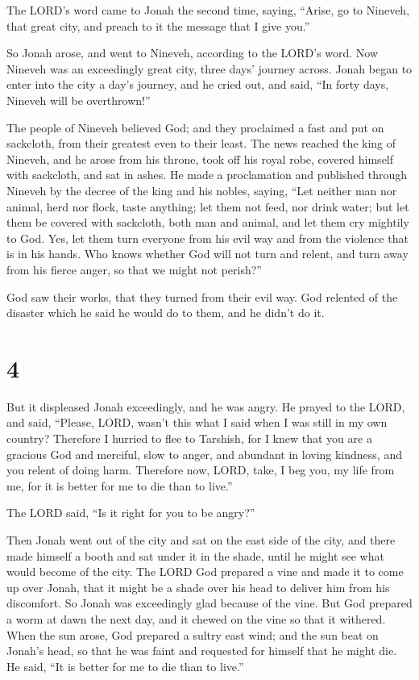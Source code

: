  The LORD's word came to Jonah the second time, saying,
 ``Arise, go to Nineveh, that great city, and preach to it
the message that I give you.''

 So Jonah arose, and went to Nineveh, according to the
LORD's word. Now Nineveh was an exceedingly great city, three days'
journey across.  Jonah began to enter into the city a
day's journey, and he cried out, and said, ``In forty days, Nineveh will
be overthrown!''

 The people of Nineveh believed God; and they proclaimed a
fast and put on sackcloth, from their greatest even to their least.
 The news reached the king of Nineveh, and he arose from
his throne, took off his royal robe, covered himself with sackcloth, and
sat in ashes.  He made a proclamation and published
through Nineveh by the decree of the king and his nobles, saying, ``Let
neither man nor animal, herd nor flock, taste anything; let them not
feed, nor drink water;  but let them be covered with
sackcloth, both man and animal, and let them cry mightily to God. Yes,
let them turn everyone from his evil way and from the violence that is
in his hands.  Who knows whether God will not turn and
relent, and turn away from his fierce anger, so that we might not
perish?''

 God saw their works, that they turned from their evil
way. God relented of the disaster which he said he would do to them, and
he didn't do it.

\hypertarget{section-3}{%
\section{4}\label{section-3}}

 But it displeased Jonah exceedingly, and he was angry.
 He prayed to the LORD, and said, ``Please, LORD, wasn't
this what I said when I was still in my own country? Therefore I hurried
to flee to Tarshish, for I knew that you are a gracious God and
merciful, slow to anger, and abundant in loving kindness, and you relent
of doing harm.  Therefore now, LORD, take, I beg you, my
life from me, for it is better for me to die than to live.''

 The LORD said, ``Is it right for you to be angry?''

 Then Jonah went out of the city and sat on the east side
of the city, and there made himself a booth and sat under it in the
shade, until he might see what would become of the city. 
The LORD God prepared a vine and made it to come up over Jonah, that it
might be a shade over his head to deliver him from his discomfort. So
Jonah was exceedingly glad because of the vine.  But God
prepared a worm at dawn the next day, and it chewed on the vine so that
it withered.  When the sun arose, God prepared a sultry
east wind; and the sun beat on Jonah's head, so that he was faint and
requested for himself that he might die. He said, ``It is better for me
to die than to live.''

